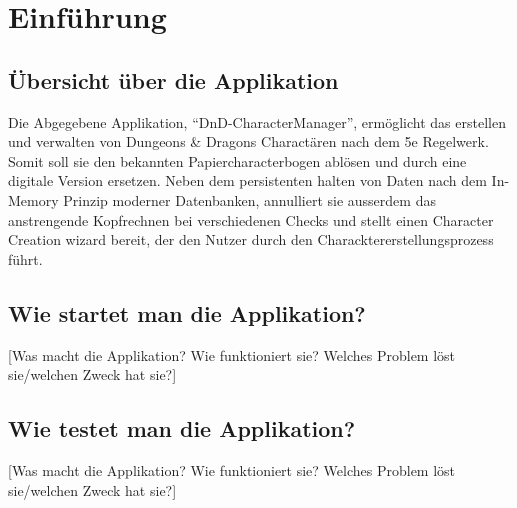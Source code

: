 \chapter{Einführung}

\section{Übersicht über die Applikation}
Die Abgegebene Applikation, \enquote{DnD-CharacterManager}, ermöglicht das erstellen und verwalten von Dungeons \& Dragons Charactären nach dem 5e Regelwerk. Somit soll sie den bekannten Papiercharacterbogen ablösen und durch eine digitale Version ersetzen. Neben dem persistenten halten von Daten nach dem In-Memory Prinzip moderner Datenbanken, annulliert sie ausserdem das anstrengende Kopfrechnen bei verschiedenen Checks und stellt einen Character Creation wizard bereit, der den Nutzer durch den Characktererstellungsprozess führt.

\section{Wie startet man die Applikation?}
[Was macht die Applikation? Wie funktioniert sie? Welches Problem löst sie/welchen Zweck hat sie?]

\section{Wie testet man die Applikation?}
[Was macht die Applikation? Wie funktioniert sie? Welches Problem löst sie/welchen Zweck hat sie?]
